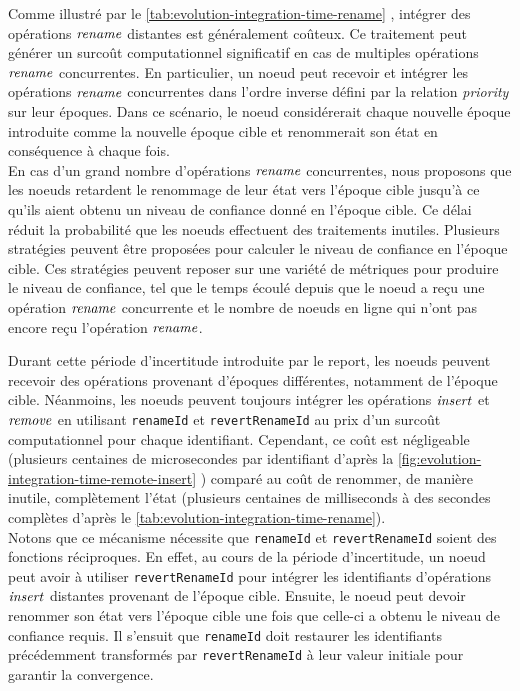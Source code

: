 Comme illustré par le \autoref{tab:evolution-integration-time-rename} , intégrer des opérations $\mathit{rename}$ distantes est généralement coûteux.
Ce traitement peut générer un surcoût computationnel significatif en cas de multiples opérations $\mathit{rename}$ concurrentes.
En particulier, un noeud peut recevoir et intégrer les opérations $\mathit{rename}$ concurrentes dans l'ordre inverse défini par la relation \emph{priority} sur leur époques.
Dans ce scénario, le noeud considérerait chaque nouvelle époque introduite comme la nouvelle époque cible et renommerait son état en conséquence à chaque fois.\\


En cas d'un grand nombre d'opérations $\mathit{rename}$ concurrentes, nous proposons que les noeuds retardent le renommage de leur état vers l'époque cible jusqu'à ce qu'ils aient obtenu un niveau de confiance donné en l'époque cible.
Ce délai réduit la probabilité que les noeuds effectuent des traitements inutiles.
Plusieurs stratégies peuvent être proposées pour calculer le niveau de confiance en l'époque cible.
Ces stratégies peuvent reposer sur une variété de métriques pour produire le niveau de confiance, tel que le temps écoulé depuis que le noeud a reçu une opération $\mathit{rename}$ concurrente et le nombre de noeuds en ligne qui n'ont pas encore reçu l'opération $\mathit{rename}$.

Durant cette période d'incertitude introduite par le report, les noeuds peuvent recevoir des opérations provenant d'époques différentes, notamment de l'époque cible.
Néanmoins, les noeuds peuvent toujours intégrer les opérations $\mathit{insert}$ et $\mathit{remove}$ en utilisant \texttt{renameId} et \texttt{revertRenameId} au prix d'un surcoût computationnel pour chaque identifiant.
Cependant, ce coût est négligeable (plusieurs centaines de microsecondes par identifiant d'après la \autoref{fig:evolution-integration-time-remote-insert} ) comparé au coût de renommer, de manière inutile, complètement l'état (plusieurs centaines de milliseconds à des secondes complètes d'après le \autoref{tab:evolution-integration-time-rename}).\\

Notons que ce mécanisme nécessite que \texttt{renameId} et \texttt{revertRenameId} soient des fonctions réciproques.
En effet, au cours de la période d'incertitude, un noeud peut avoir à utiliser \texttt{revertRenameId} pour intégrer les identifiants d'opérations $\mathit{insert}$ distantes provenant de l'époque cible.
Ensuite, le noeud peut devoir renommer son état vers l'époque cible une fois que celle-ci a obtenu le niveau de confiance requis.
Il s'ensuit que \texttt{renameId} doit restaurer les identifiants précédemment transformés par \texttt{revertRenameId} à leur valeur initiale pour garantir la convergence.

